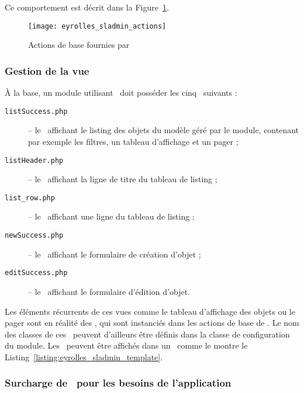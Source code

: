 Ce comportement est décrit dans la Figure~\ref{figure:eyrolles_sladmin_actions}.

\begin{figure}
	\centering
	\texttt{[image: eyrolles\_sladmin\_actions]}
	\caption{Actions de base fournies par \asladmin}
	\label{figure:eyrolles_sladmin_actions}
\end{figure}


\subsubsection{Gestion de la vue}
\label{section:eyrolles_sladmin_view}

À la base, un module utilisant \asladmin\ doit posséder les cinq \atemplates\ suivants :
\begin{description}
	\item[\texttt{listSuccess.php}] -- le \atemplate\ affichant le listing des objets du modèle géré par le module, contenant par exemple les filtres, un tableau d'affichage et un pager ;
	\item[\texttt{listHeader.php}] -- le \apartial\ affichant la ligne de titre du tableau de listing ;
	\item[\texttt{list\_row.php}] -- le \apartial\ affichant une ligne du tableau de listing ;
	\item[\texttt{newSuccess.php}] -- le \atemplate\ affichant le formulaire de création d'objet ;
	\item[\texttt{editSuccess.php}] -- le \atemplate\ affichant le formulaire d'édition d'objet.
\end{description}

Les éléments récurrents de ces vues comme le tableau d'affichage des objets ou le pager sont en réalité des \awidgets, qui sont instanciés dans les actions de base de \asladmin. Le nom des classes de ces \awidgets\ peuvent d'ailleurs être définis dans la classe de configuration du module. Les \awidgets\ peuvent être affichés dans un \atemplate\ comme le montre le Listing~\ref{listing:eyrolles_sladmin_template}.




\subsubsection{Surcharge de \asladmin\ pour les besoins de l'application}

